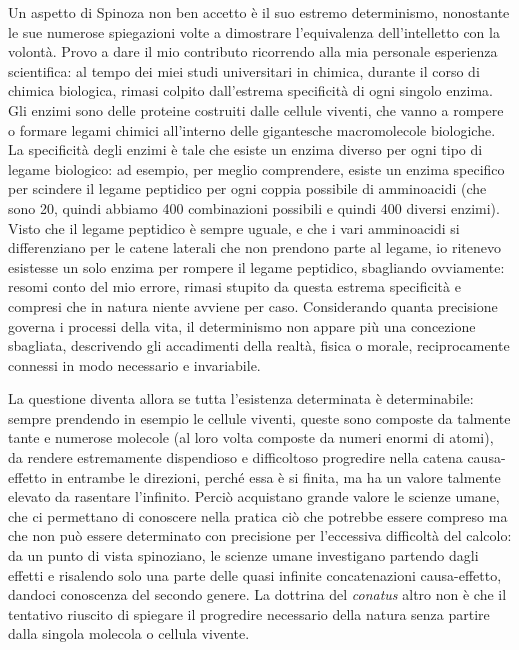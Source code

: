 Un aspetto di Spinoza non ben accetto è il suo estremo determinismo, nonostante le sue numerose spiegazioni volte a dimostrare l'equivalenza dell'intelletto con la volontà. Provo a dare il mio contributo ricorrendo alla mia personale esperienza scientifica: al tempo dei miei studi universitari in chimica, durante il corso di chimica biologica, rimasi colpito dall'estrema specificità di ogni singolo enzima. Gli enzimi sono delle proteine costruiti dalle cellule viventi, che vanno a rompere o formare legami chimici all'interno delle gigantesche macromolecole biologiche. La specificità degli enzimi è tale che esiste un enzima diverso per ogni tipo di legame biologico: ad esempio, per meglio comprendere, esiste un enzima specifico per scindere il legame peptidico per ogni coppia possibile di amminoacidi (che sono 20, quindi abbiamo 400 combinazioni possibili e quindi 400 diversi enzimi). Visto che il legame peptidico è sempre uguale, e che i vari amminoacidi si differenziano per le catene laterali che non prendono parte al legame, io ritenevo esistesse un solo enzima per rompere il legame peptidico, sbagliando ovviamente: resomi conto del mio errore, rimasi stupito da questa estrema specificità e compresi che in natura niente avviene per caso. Considerando quanta precisione  governa i processi della vita, il determinismo  non appare più una concezione sbagliata, descrivendo gli accadimenti della realtà, fisica o morale, reciprocamente connessi in modo necessario e invariabile.

La questione diventa allora se tutta l'esistenza determinata è determinabile: sempre prendendo in esempio le cellule viventi, queste sono composte da talmente tante e numerose molecole (al loro volta composte da numeri enormi di atomi), da rendere estremamente dispendioso e difficoltoso progredire nella catena causa-effetto in entrambe le direzioni, perché essa è si finita, ma ha un valore talmente elevato da rasentare l'infinito. Perciò acquistano grande valore le scienze umane, che ci permettano di conoscere nella pratica ciò che potrebbe essere compreso ma che non può essere determinato con precisione per l'eccessiva difficoltà del calcolo: da un punto di vista spinoziano, le scienze umane investigano partendo dagli effetti e risalendo solo una parte delle quasi infinite concatenazioni causa-effetto, dandoci conoscenza del secondo genere. La dottrina del \textit{conatus} altro non è che il tentativo riuscito di spiegare il progredire necessario della natura senza partire dalla singola molecola  o cellula vivente.

